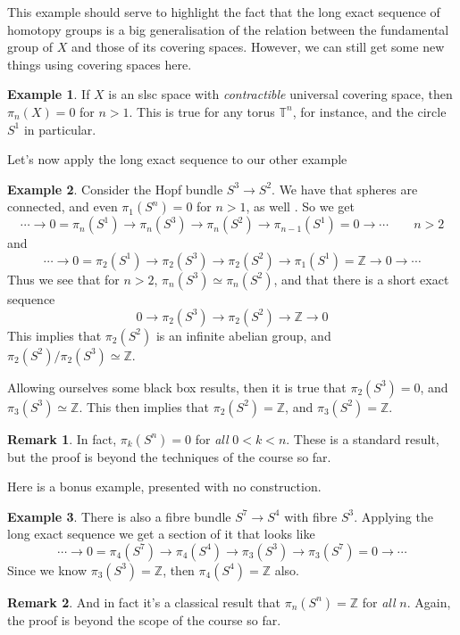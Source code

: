 \documentclass{tufte-handout}
\def\ZZ{\mathbb{Z}}
\theoremstyle{definition}
\newtheorem{example}{Example}
\newtheorem*{rem}{Remark}
\begin{document}
This example should serve to highlight the fact that the long exact sequence of homotopy groups is a big generalisation of the relation between the fundamental group of $X$ and those of its covering spaces. However, we can still get some new things using covering spaces here. 

\begin{example}
If $X$ is an slsc space with \emph{contractible} universal covering space, then $\pi_n(X) = 0$ for $n>1$. This is true for any torus $\mathbb{T}^n$, for instance, and the circle $S^1$ in particular.
\end{example}

Let's now apply the long exact sequence to our other example

\begin{example}
Consider the Hopf bundle $S^3\to S^2$. We have that spheres are connected, and even $\pi_1(S^n) = 0$ for $n>1$, as well . So we get
\[
 \cdots \to 0 = \pi_n(S^1) \to \pi_n(S^3) \to \pi_n(S^2) \to \pi_{n-1}(S^1) = 0 \to \cdots \qquad n>2
\]
and
\[
\cdots \to 0=\pi_2(S^1) \to \pi_2(S^3) \to \pi_2(S^2) \to \pi_1(S^1) = \ZZ \to 0 \to \cdots
\]
Thus we see that for $n>2$, $\pi_n(S^3) \simeq \pi_n(S^2)$, and that there is a short exact sequence 
\[
0\to \pi_2(S^3) \to \pi_2(S^2) \to \ZZ \to 0
\]
This implies that $\pi_2(S^2)$ is an infinite abelian group, and $\pi_2(S^2)/ \pi_2(S^3) \simeq \ZZ$.
\end{example}
Allowing ourselves some black box results, then it is true that $\pi_2(S^3) = 0$, and $\pi_3(S^3) \simeq \ZZ$. This then implies that $\pi_2(S^2) = \ZZ$, and $\pi_3(S^2) = \ZZ$.

\begin{rem}
In fact, $\pi_k(S^n) = 0$ for \emph{all} $0<k<n$. These is a standard result, but the proof is beyond the techniques of the course so far.
\end{rem} 

Here is a bonus example, presented with no construction.
\begin{example}
There is also a fibre bundle $S^7\to S^4$ with fibre $S^3$. Applying the long exact sequence we get a section of it that looks like
\[
\cdots \to 0=\pi_4(S^7) \to \pi_4(S^4) \to \pi_3(S^3) \to \pi_3(S^7) = 0 \to \cdots 
\]
Since we know $\pi_3(S^3) = \ZZ$, then $\pi_4(S^4) = \ZZ$ also.
\end{example}

\begin{rem}
And in fact it's a classical result that $\pi_n(S^n) = \ZZ$ for \emph{all} $n$. Again, the proof is beyond the scope of the course so far.
\end{rem}
\end{document}

